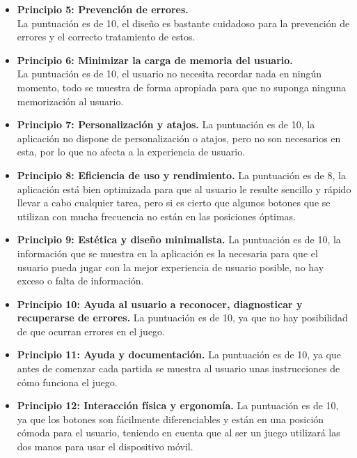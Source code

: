 \begin{itemize}
  \item \textbf{Principio 5: Prevención de errores.}\\
  La puntuación es de 10, el diseño es bastante cuidadoso para la prevención de errores y el correcto tratamiento de estos.

  \item \textbf{Principio 6: Minimizar la carga de memoria del usuario.}\\
  La puntuación es de 10, el usuario no necesita recordar nada en ningún momento, todo se muestra de forma apropiada para que no suponga ninguna memorización al usuario.

  \item \textbf{Principio 7: Personalización y atajos.}
  La puntuación es de 10, la aplicación no dispone de personalización o atajos, pero no son necesarios en esta, por lo que no afecta a la experiencia de usuario.

  \item \textbf{Principio 8: Eficiencia de uso y rendimiento.}
  La puntuación es de 8, la aplicación está bien optimizada para que al usuario le resulte sencillo y rápido llevar a cabo cualquier tarea, pero si es cierto que algunos botones que se utilizan con mucha frecuencia no están en las posiciones óptimas.

  \item \textbf{Principio 9: Estética y diseño minimalista.}
  La puntuación es de 10, la información que se muestra en la aplicación es la necesaria para que el usuario pueda jugar con la mejor experiencia de usuario posible, no hay exceso o falta de información.

  \item \textbf{Principio 10: Ayuda al usuario a reconocer, diagnosticar y recuperarse de errores.}
  La puntuación es de 10, ya que no hay posibilidad de que ocurran errores en el juego.

  \item \textbf{Principio 11: Ayuda y documentación.}
  La puntuación es de 10, ya que antes de comenzar cada partida se muestra al usuario unas instrucciones de cómo funciona el juego.

  \item \textbf{Principio 12: Interacción física y ergonomía.}
  La puntuación es de 10, ya que los botones son fácilmente diferenciables y están en una posición cómoda para el usuario, teniendo en cuenta que al ser un juego utilizará las dos manos para usar el dispositivo móvil.

\end{itemize}

